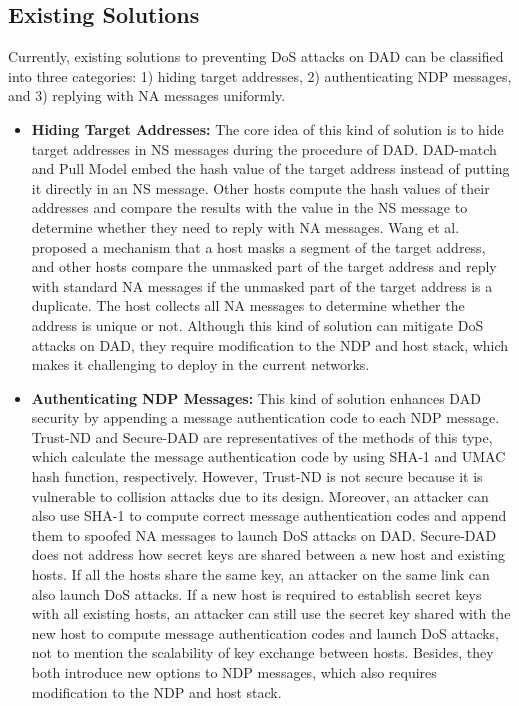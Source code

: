 \documentclass[journal]{IEEEtran}
\begin{document}
    \subsection{Existing Solutions}
        Currently, existing solutions to preventing DoS attacks on DAD can be classified into three categories: 1) hiding target addresses, 2) authenticating NDP messages, and 3) replying with NA messages uniformly.

        \begin{itemize}
        \item\textbf{Hiding Target Addresses:}
            The core idea of this kind of solution is to hide target addresses in NS messages during the procedure of DAD. DAD-match \cite{DAD-match} and Pull Model \cite{pull-model} embed the hash value of the target address instead of putting it directly in an NS message. Other hosts compute the hash values of their addresses and compare the results with the value in the NS message to determine whether they need to reply with NA messages. Wang et al. \cite{part-dad} proposed a mechanism that a host masks a segment of the target address, and other hosts compare the unmasked part of the target address and reply with standard NA messages if the unmasked part of the target address is a duplicate. The host collects all NA messages to determine whether the address is unique or not. Although this kind of solution can mitigate DoS attacks on DAD, they require modification to the NDP and host stack, which makes it challenging to deploy in the current networks.

        \item\textbf{Authenticating NDP Messages:}
            This kind of solution enhances DAD security by appending a message authentication code to each NDP message. Trust-ND \cite{trust-nd} and Secure-DAD \cite{secure-dad} are representatives of the methods of this type, which calculate the message authentication code by using SHA-1 and UMAC hash function, respectively. 
            However, Trust-ND is not secure because it is vulnerable to collision attacks due to its design. Moreover, an attacker can also use SHA-1 to compute correct message authentication codes and append them to spoofed NA messages to launch DoS attacks on DAD. Secure-DAD does not address how secret keys are shared between a new host and existing hosts. If all the hosts share the same key, an attacker on the same link can also launch DoS attacks. If a new host is required to establish secret keys with all existing hosts, an attacker can still use the secret key shared with the new host to compute message authentication codes and launch DoS attacks, not to mention the scalability of key exchange between hosts.
            Besides, they both introduce new options to NDP messages, which also requires modification to the NDP and host stack. 
        

\end{itemize}
\end{document}
